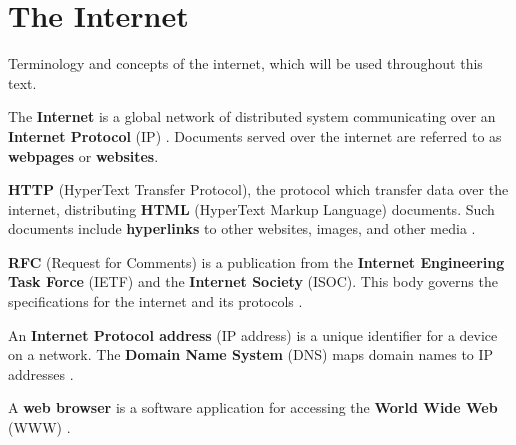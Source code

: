 \section{The Internet}

\noindent
Terminology and concepts of the internet, which will be used throughout this text.

\begin{Def}[Internet]

    The \textbf{Internet} is a global network of distributed system communicating over an \textbf{Internet Protocol} (IP) \cite{cloudflare_internet_protocol}.
    Documents served over the internet are referred to as \textbf{webpages} or \textbf{websites}.
\end{Def}
\begin{Def}

    \textbf{HTTP} (HyperText Transfer Protocol), the protocol which transfer data over the internet, 
    distributing \textbf{HTML} (HyperText Markup Language) documents. Such 
    documents include \textbf{hyperlinks} to other websites, images, and other media \cite{rfc9110}.
\end{Def}
\begin{Def}

    \textbf{RFC} (Request for Comments) is a publication from the \textbf{Internet Engineering Task Force} (IETF) 
    and the \textbf{Internet Society} (ISOC). This body governs the specifications for the internet and its protocols \cite{rfc}.
\end{Def}

\begin{Def}

    An \textbf{Internet Protocol address} (IP address) is a unique identifier for a device on a network. 
    The \textbf{Domain Name System} (DNS) maps domain names to IP addresses \cite{rfc760}.
\end{Def}

\newpage

\begin{Def}

    A \textbf{web browser} is a software application for accessing the \textbf{World Wide Web} (WWW) \cite{ou_internet_history}.
\end{Def}

